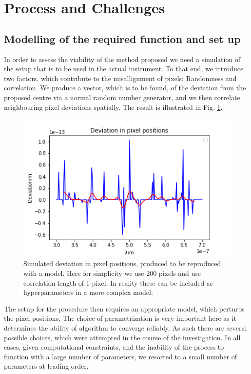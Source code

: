 \documentclass[12pt]{article}
\begin{document}
\section{Process and Challenges}
    \subsection{Modelling of the required function and set up}
    In order to assess the viability of the method proposed we need a simulation of the 
    setup that is to be used in the actual instrument. To that end, we introduce two factors,
    which contribute to the misallignment of pixels: Randomness and correlation. We produce
    a vector, which is to be found, of the deviation from the proposed centre via a normal
    random number generator, and we then correlate neighbouring pixel deviations spatially.
    The result is illustrated in Fig. \ref{tru_vals}.

    \begin{figure}[H]
        \centering
        \includegraphics[scale=0.8]{true_vals.png}
        \caption{Simulated deviation in pixel positions, produced to
        be reproduced with a model. Here for simplicity we use 200 pixels
        and use correlation length of 1 pixel. In reality these can be included
        as hyperparameters in a more complex model.}
        \label{tru_vals}
    \end{figure}

    The setup for the procedure then requires an appropriate model, which perturbs the pixel positions,
    The choice of parametrization is very important here as it determines the ability of algorithm to 
    converge reliably. As such there are several possible choices, which were attempted
    in the course of the investigation. In all cases, given computational constraints,
    and the inability of the process to function with a large number of parameters, we 
    resorted to a small number of parameters at leading order.
\end{document}
